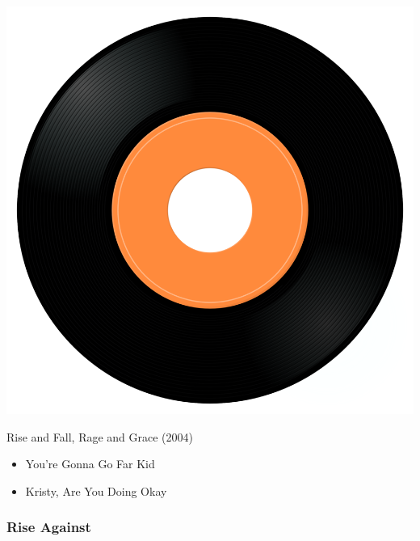 \begin{minipage}[t]{0.25\textwidth}
\captionsetup{type=figure}
\includegraphics[width=\textwidth]{Images/cover.png}
\caption*{Rise and Fall, Rage and Grace  (2004)}
\end{minipage}
\begin{minipage}[t]{0.25\textwidth}\vspace{0pt}
\begin{itemize}[nosep,leftmargin=1em,labelwidth=*,align=left]
	\setlength{\itemsep}{0pt}
	\item You're Gonna Go Far Kid
	\item Kristy, Are You Doing Okay 
\end{itemize}
\end{minipage}

\subsubsection{Rise Against}

